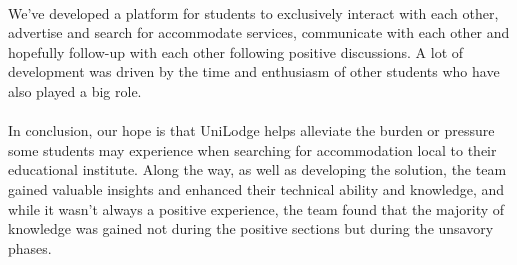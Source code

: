 \paragraph{}
We've developed a platform for students to exclusively interact with each other, advertise and search for accommodate services, communicate with each other and hopefully follow-up with each other following positive discussions. A lot of development was driven by the time and enthusiasm of other students who have also played a big role.

\paragraph{}
In conclusion, our hope is that UniLodge helps alleviate the burden or pressure some students may experience when searching for accommodation local to their educational institute. Along the way, as well as developing the solution, the team gained valuable insights and enhanced their technical ability and knowledge, and while it wasn't always a positive experience, the team found that the majority of knowledge was gained not during the positive sections but during the unsavory phases.